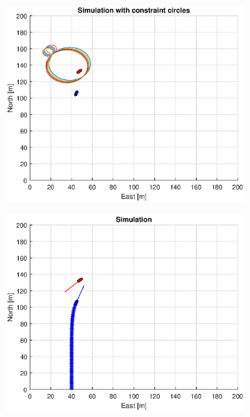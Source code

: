 \begin{figure}[ht]\ContinuedFloat
    \begin{subfigure}[b]{0.49\textwidth}
        \centering
        \includegraphics[width=\textwidth]{Images/Figures/sving_HO/Simple0_f1_Frame4}
    \end{subfigure}
    \hfill
    \begin{subfigure}[b]{0.499\textwidth}
        \centering
        \includegraphics[width=\textwidth]{Images/Figures/sving_HO/Simple0_f600_Frame4}

\end{subfigure}
\end{figure}
